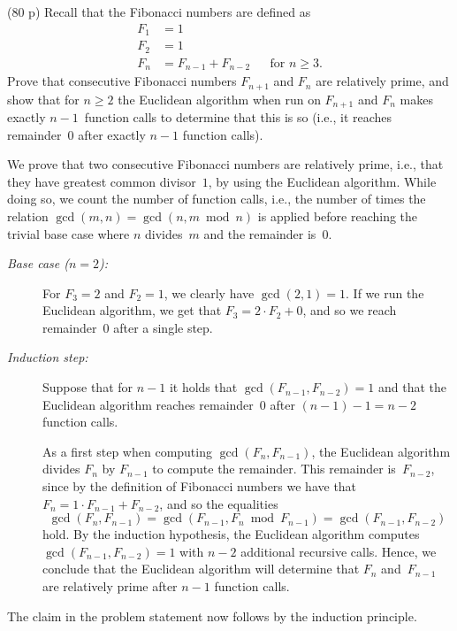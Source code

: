 \documentclass{jn-pset}
\begin{document}
\begin{problem}%
  (80 p)
  Recall that the Fibonacci numbers are defined as
  \begin{align*}
    F_1 &= 1 \\
    F_2 &= 1 \\
    F_n &= F_{n - 1} +  F_{n - 2} &&\text{for $n \geq 3$.}
  \end{align*}
  Prove that consecutive Fibonacci numbers
  $F_{n+1}$
  and
  $F_{n}$
  are relatively prime, and show that for  $n \geq 2$
  the  Euclidean algorithm when run on $F_{n+1}$ and $F_n$
  makes exactly $n-1$~function calls to determine that this is so
  (i.e., it reaches remainder~$0$ after exactly $n-1$
  function calls).

\begin{solution}
  We prove that two consecutive Fibonacci numbers are relatively
  prime, i.e., that they have greatest common divisor~$1$, by using
  the Euclidean algorithm. While doing so, we count the number of
  function calls, i.e., the number of times the relation
  $
  \gcd (m, n) 
  =
  \gcd (n, m \bmod n) 
  $
  is applied before reaching the trivial base case where $n$
  divides~$m$
  and the remainder is~$0$.

  \begin{description}
  \item[\emph{Base case ($n=2$):}]
    For
    $F_3 = 2$
    and
    $F_2 = 1$,
    we clearly have
    $
    \gcd ( 2, 1 ) = 1
    $.
    If we run the Euclidean algorithm, we get that
    $
    F_3 = 2 \cdot F_2 + 0
    $,
    and so we reach remainder~$0$ after a single step.
    
  \item[\emph{Induction step:}]
    Suppose that for $n-1$ it holds that
    $
    \gcd ( F_{n - 1} , F_{n - 2}) = 1
    $
    and that the Euclidean algorithm reaches remainder~$0$ after
    $(n-1) - 1 = n-2 $ function calls.

    As a first step when computing
    $
    \gcd ( F_{n} ,  F_{n - 1})
    $,
    the Euclidean algorithm divides
    $F_{n}$ by  $F_{n - 1}$
    to compute the remainder.
    This remainder is~$F_{n-2}$, since by the definition of Fibonacci
    numbers we have that
    $F_n = 1 \cdot F_{n - 1} +  F_{n - 2}$,
    and so the equalities
    \begin{equation}
      \gcd ( F_{n} ,  F_{n - 1})
      =
      \gcd ( F_{n-1} , F_n \bmod F_{n - 1})
      =
      \gcd ( F_{n-1} ,  F_{n - 2})
    \end{equation}
    hold.
    By the induction hypothesis,  the Euclidean algorithm
    computes
    $\gcd ( F_{n-1} ,  F_{n - 2}) = 1  $
    with $n-2$ additional recursive calls. 
    Hence, we conclude that the Euclidean algorithm will
    determine that
    $F_n$ and~$F_{n-1}$
    are relatively prime after $n-1$ function calls.
  \end{description}
  The claim in the problem statement now follows by the induction principle.
\end{solution}


\end{problem}
\end{document}

